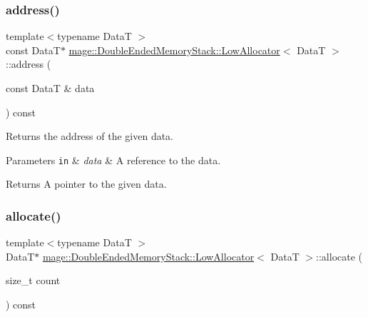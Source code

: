\subsubsection{\texorpdfstring{address()}{address()}\hspace{0.1cm}{\footnotesize\ttfamily [2/2]}}
{\footnotesize\ttfamily template$<$typename DataT $>$ \\
const DataT$\ast$ \hyperlink{structmage_1_1_double_ended_memory_stack_1_1_low_allocator}{mage\+::\+Double\+Ended\+Memory\+Stack\+::\+Low\+Allocator}$<$ DataT $>$\+::address (\begin{DoxyParamCaption}\item[{const DataT \&}]{data }\end{DoxyParamCaption}) const\hspace{0.3cm}{\ttfamily [noexcept]}}

Returns the address of the given data.


\begin{DoxyParams}[1]{Parameters}
\mbox{\tt in}  & {\em data} & A reference to the data. \\
\hline
\end{DoxyParams}
\begin{DoxyReturn}{Returns}
A pointer to the given data. 
\end{DoxyReturn}
\hypertarget{structmage_1_1_double_ended_memory_stack_1_1_low_allocator_a447a18b6db5720cac0f8ffcf09eb7446}{}\label{structmage_1_1_double_ended_memory_stack_1_1_low_allocator_a447a18b6db5720cac0f8ffcf09eb7446} 
\subsubsection{\texorpdfstring{allocate()}{allocate()}\hspace{0.1cm}{\footnotesize\ttfamily [1/2]}}
{\footnotesize\ttfamily template$<$typename DataT $>$ \\
DataT$\ast$ \hyperlink{structmage_1_1_double_ended_memory_stack_1_1_low_allocator}{mage\+::\+Double\+Ended\+Memory\+Stack\+::\+Low\+Allocator}$<$ DataT $>$\+::allocate (\begin{DoxyParamCaption}\item[{size\+\_\+t}]{count }\end{DoxyParamCaption}) const}

